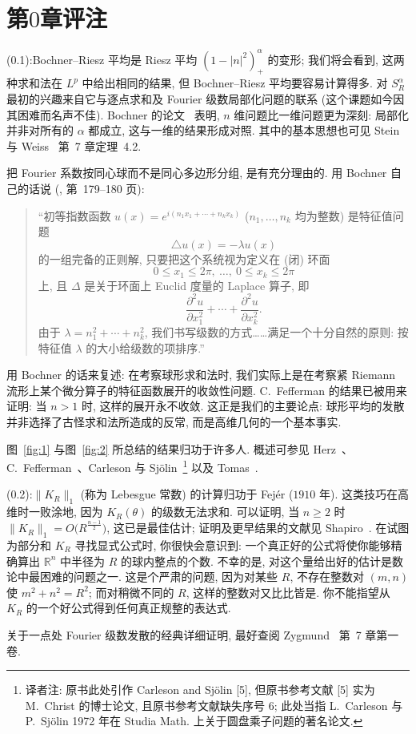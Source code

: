 \section{第\texorpdfstring{$0$}{0}章评注}
\label{sec:0.4}

\noindent (0.1):\quad Bochner--Riesz 平均是 Riesz 平均 $(1-|n|^2)_+^{\alpha}$ 的变形; 我们将会看到, 这两种求和法在 $L^p$ 中给出相同的结果, 但 Bochner--Riesz 平均要容易计算得多. 对 $S_R^{\alpha}$ 最初的兴趣来自它与逐点求和及 Fourier 级数局部化问题的联系 (这个课题如今因其困难而名声不佳). Bochner 的论文~\cite{bochner} 表明, $n$ 维问题比一维问题更为深刻: 局部化并非对所有的 $\alpha$ 都成立, 这与一维的结果形成对照. 其中的基本思想也可见 Stein 与 Weiss~\cite{steinweiss} 第~7 章定理~4.2.

把 Fourier 系数按同心球而不是同心多边形分组, 是有充分理由的. 用 Bochner 自己的话说 (\cite{bochner}, 第~179--180 页):

\begin{quote}
``初等指数函数 $u(x)=e^{i(n_1x_1+\cdots+n_kx_k)}$ ($n_1,\ldots,n_k$ 均为整数) 是特征值问题
\[
\triangle u(x)=-\lambda u(x)
\]
的一组完备的正则解, 只要把这个系统视为定义在 (闭) 环面
\[
0\leq x_1\leq 2\pi,\ \ldots,\ 0\leq x_k\leq 2\pi
\]
上, 且 $\Delta$ 是关于环面上 Euclid 度量的 Laplace 算子, 即
\[
\frac{\partial^2 u}{\partial x_1^2}+\cdots+\frac{\partial^2 u}{\partial x_k^2}.
\]
由于 $\lambda=n_1^2+\cdots+n_k^2$, 我们书写级数的方式……满足一个十分自然的原则: 按特征值 $\lambda$ 的大小给级数的项排序.''
\end{quote}

用 Bochner 的话来复述: 在考察球形求和法时, 我们实际上是在考察紧 Riemann 流形上某个微分算子的特征函数展开的收敛性问题. C.~Fefferman 的结果已被用来证明: 当 $n>1$ 时, 这样的展开永不收敛. 这正是我们的主要论点: 球形平均的发散并非选择了古怪求和法所造成的反常, 而是高维几何的一个基本事实.

图~\ref{fig:1} 与图~\ref{fig:2} 所总结的结果归功于许多人. 概述可参见 Herz~\cite{herz}、C.~Fefferman~\cite{fefferman-spherical}、Carleson 与 Sjölin~\cite{christ}\footnote{译者注: 原书此处引作 Carleson and Sjölin [5], 但原书参考文献 [5] 实为 M.~Christ 的博士论文, 且原书参考文献缺失序号 6; 此处当指 L.~Carleson 与 P.~Sjölin 1972 年在 Studia Math. 上关于圆盘乘子问题的著名论文.} 以及 Tomas~\cite{tomas1}.

\noindent (0.2):\quad $\|K_R\|_1$ (称为 Lebesgue 常数) 的计算归功于 Fejér ($1910$ 年). 这类技巧在高维时一败涂地, 因为 $K_R(\theta)$ 的级数无法求和. 可以证明, 当 $n\geq 2$ 时 $\|K_R\|_1=O\bigl(R^{\frac{n-1}{2}}\bigr)$, 这已是最佳估计; 证明及更早结果的文献见 Shapiro~\cite{shapiro}. 在试图为部分和 $K_R$ 寻找显式公式时, 你很快会意识到: 一个真正好的公式将使你能够精确算出 $\mathbb{R}^n$ 中半径为 $R$ 的球内整点的个数. 不幸的是, 对这个量给出好的估计是数论中最困难的问题之一. 这是个严肃的问题, 因为对某些 $R$, 不存在整数对 $(m,n)$ 使 $m^2+n^2=R^2$; 而对稍微不同的 $R$, 这样的整数对又比比皆是. 你不能指望从 $K_R$ 的一个好公式得到任何真正规整的表达式.

关于一点处 Fourier 级数发散的经典详细证明, 最好查阅 Zygmund~\cite{zygmund} 第~7 章第一卷.
